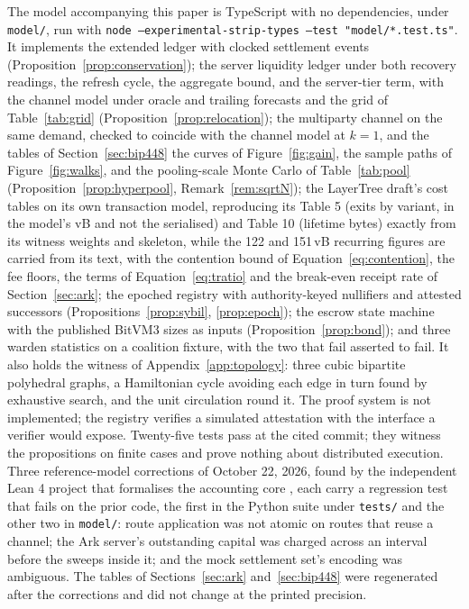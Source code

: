 \documentclass[11pt]{article}
\theoremstyle{plain}
\theoremstyle{definition}
\theoremstyle{remark}
\begin{document}
The model accompanying this paper \citep{spiral2026} is TypeScript with no dependencies, under \texttt{model/}, run with \texttt{node --experimental-strip-types --test "model/*.test.ts"}. It implements the extended ledger with clocked settlement events (Proposition~\ref{prop:conservation}); the server liquidity ledger under both recovery readings, the refresh cycle, the aggregate bound, and the server-tier term, with the channel model under oracle and trailing forecasts and the grid of Table~\ref{tab:grid} (Proposition~\ref{prop:relocation}); the multiparty channel on the same demand, checked to coincide with the channel model at $k=1$, and the tables of Section~\ref{sec:bip448} the curves of Figure~\ref{fig:gain}, the sample paths of Figure~\ref{fig:walks}, and the pooling-scale Monte Carlo of Table~\ref{tab:pool} (Proposition~\ref{prop:hyperpool}, Remark~\ref{rem:sqrtN}); the LayerTree draft's cost tables on its own transaction model, reproducing its Table 5 (exits by variant, in the model's vB and not the serialised) and Table 10 (lifetime bytes) exactly from its witness weights and skeleton, while the 122 and 151\,vB recurring figures are carried from its text, with the contention bound of Equation~\eqref{eq:contention}, the fee floors, the terms of Equation~\eqref{eq:tratio} and the break-even receipt rate of Section~\ref{sec:ark}; the epoched registry with authority-keyed nullifiers and attested successors (Propositions~\ref{prop:sybil}, \ref{prop:epoch}); the escrow state machine with the published BitVM3 sizes as inputs (Proposition~\ref{prop:bond}); and three warden statistics on a coalition fixture, with the two that fail asserted to fail. It also holds the witness of Appendix~\ref{app:topology}: three cubic bipartite polyhedral graphs, a Hamiltonian cycle avoiding each edge in turn found by exhaustive search, and the unit circulation round it. The proof system is not implemented; the registry verifies a simulated attestation with the interface a verifier would expose. Twenty-five tests pass at the cited commit; they witness the propositions on finite cases and prove nothing about distributed execution. Three reference-model corrections of October 22, 2026, found by the independent Lean 4 project that formalises the accounting core \citep{dugan2026formal}, each carry a regression test that fails on the prior code, the first in the Python suite under \texttt{tests/} and the other two in \texttt{model/}: route application was not atomic on routes that reuse a channel; the Ark server's outstanding capital was charged across an interval before the sweeps inside it; and the mock settlement set's encoding was ambiguous. The tables of Sections~\ref{sec:ark} and~\ref{sec:bip448} were regenerated after the corrections and did not change at the printed precision.
\end{document}
